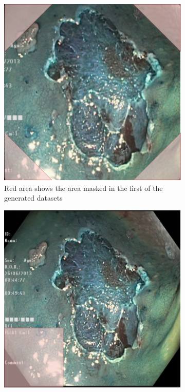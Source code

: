 \begin{figure}
\begin{subfigure}[t]{0.4\textwidth}
         \includegraphics[width=\textwidth]{methodology/figures/cornermask.png}
         \caption{Red area shows the area masked in the first of the generated datasets}
         \label{fig:CornerMask}
     \end{subfigure}
     \hfill
     \begin{subfigure}[t]{0.4\textwidth}
         \centering
         \includegraphics[width=\textwidth]{methodology/figures/greenmask.png}

\end{subfigure}
\end{figure}
